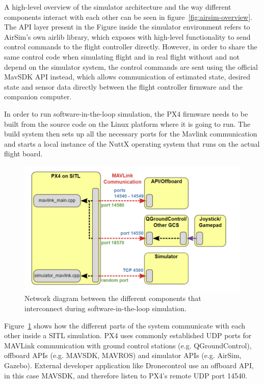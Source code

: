 A high-level overview of the simulator architecture and the way different components interact with each other can be seen in figure~\ref{fig:airsim-overview}. 
The API layer present in the Figure inside the simulator environment refers to AirSim's own airlib library, which exposes with high-level functionality to send control commands to the flight controller directly.
However, in order to share the same control code when simulating flight and in real flight without and not depend on the simulator system, the control commands are sent using the official MavSDK API instead, which allows communication of estimated state, desired state and sensor data directly between the flight controller firmware and the companion computer.

In order to run software-in-the-loop simulation, the PX4 firmware needs to be built from the source code on the Linux platform where it is going to run.
The build system then sets up all the necessary ports for the Mavlink communication and starts a local instance of the NuttX operating system that runs on the actual flight board.
\begin{figure}
  \centering
  \includegraphics[width=\textwidth,keepaspectratio]{img/px4-ports.png}
  \caption{Network diagram between the different components that interconnect during software-in-the-loop simulation.}
  \label{fig:px4-ports}
\end{figure}
Figure~\ref{fig:px4-ports} shows how the different parts of the system communicate with each other inside a SITL simulation.
PX4 uses commonly established UDP ports for MAVLink communication with ground control stations (e.g. QGroundControl), offboard APIs (e.g. MAVSDK, MAVROS) and simulator APIs (e.g. AirSim, Gazebo).
External developer application like Dronecontrol use an offboard API, in this case MAVSDK, and therefore listen to PX4's remote UDP port 14540.

